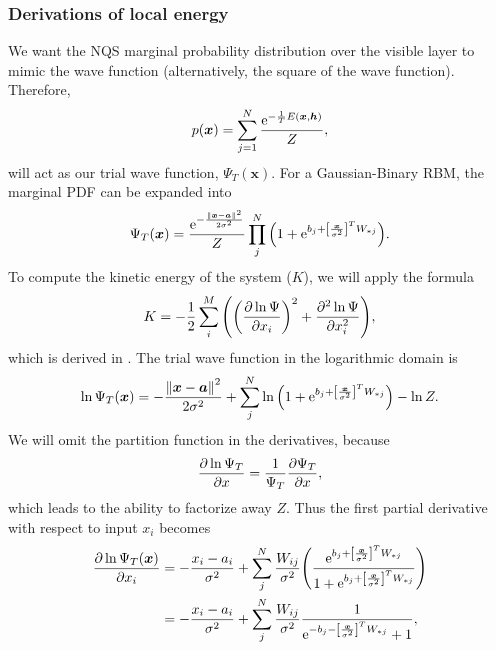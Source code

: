 \subsubsection{Derivations of local energy}

We want the NQS marginal probability distribution over the visible layer to mimic the wave function (alternatively, the square of the wave function). Therefore, 
\begin{equation*}
    p(\bm{x}) = \sum_{j=1}^N \frac{\mathrm{e}^{-\frac{1}{T}E\qty(\bm{x}, \bm{h})}}{Z}, 
\end{equation*}
will act as our trial wave function, $\Psi_T(\bm{x})$. For a Gaussian-Binary RBM, the marginal PDF can be expanded into
\begin{equation*}
    \Psi_T(\bm{x}) = \frac{\mathrm{e}^{-\frac{\norm{\bm{x}-\bm{a}}^2}{2\sigma^2}}}{Z}\prod_j^N \qty(1 + \mathrm{e}^{b_j + \qty[\frac{\bm{x}}{\sigma^2}]^T W_{*j}}). 
\end{equation*}
To compute the kinetic energy of the system ($K$), we will apply the formula 
\begin{equation*}
    K = -\frac{1}{2}\sum_i^M \qty(\qty(\pdv{\ln{\Psi}}{x_i})^2 + \pdv[2]{\ln{\Psi}}{x_i}), 
\end{equation*}
which is derived in \citep{project1}. The trial wave function in the logarithmic domain is 
\begin{equation*}
    \ln{\Psi_T\qty(\bm{x})} = -\frac{\norm{\bm{x}-\bm{a}}^2}{2\sigma^2} + \sum_j^N \ln{\qty(1+\mathrm{e}^{b_j + \qty[\frac{\bm{x}}{\sigma^2}]^T W_{*j}})} - \ln{Z}. 
\end{equation*}
We will omit the partition function in the derivatives, because 
\begin{equation*}
    \pdv{\ln{\Psi_T}}{x} = \frac{1}{\Psi_T}\pdv{\Psi_T}{x}, 
\end{equation*}
which leads to the ability to factorize away $Z$. 
Thus the first partial derivative with respect to input $x_i$ becomes 
\begin{align*}
    \pdv{\ln{\Psi_T\qty(\bm{x})}}{x_i} &= -\frac{x_i-a_i}{\sigma^2} + \sum_j^N\frac{W_{ij}}{\sigma^2}\qty(\frac{\mathrm{e}^{b_j + \qty[\frac{\bm{x}}{\sigma^2}]^T W_{*j}}}{1+\mathrm{e}^{b_j + \qty[\frac{\bm{x}}{\sigma^2}]^T W_{*j}}}) \\
    &= -\frac{x_i-a_i}{\sigma^2} + \sum_j^N\frac{W_{ij}}{\sigma^2}\frac{1}{\mathrm{e}^{-b_j-\qty[\frac{\bm{x}}{\sigma^2}]^TW_{*j}}+1}, 
\end{align*}
